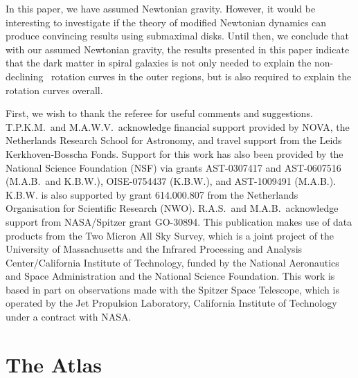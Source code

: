 \documentclass[traditabstract]{aa} %
\begin{document}
In this paper, we have assumed Newtonian gravity. However, it would be interesting to 
investigate if the theory of modified Newtonian dynamics \citep[MOND;][]{milgrom1983} can 
produce convincing results using submaximal disks. Until then, we conclude that with our 
assumed Newtonian gravity, the results presented in this paper indicate that the dark 
matter in spiral galaxies is not only needed to explain the non-declining \hone\ rotation 
curves in the outer regions, but is also required to explain the rotation curves overall.


\acknowledgements
First, we wish to thank the referee for useful comments and suggestions.
T.P.K.M.\ and M.A.W.V.\ acknowledge financial support provided by NOVA, the Netherlands
Research School for Astronomy, and travel support from the Leids Kerkhoven-Bosscha Fonds.
Support for this work has also been provided by the National Science Foundation (NSF) via
grants AST-0307417 and AST-0607516 (M.A.B.\ and K.B.W.), OISE-0754437 (K.B.W.), and
AST-1009491 (M.A.B.). K.B.W. is also supported by grant 614.000.807 from the Netherlands
Organisation for Scientific Research (NWO). R.A.S.\ and M.A.B.\ acknowledge support from
NASA/Spitzer grant GO-30894.
%
This publication makes use of data products from the Two Micron All Sky Survey, which is a
joint project of the University of Massachusetts and the Infrared Processing and Analysis
Center/California Institute of Technology, funded by the National Aeronautics and Space
Administration and the National Science Foundation.
This work is based in part on observations made with the Spitzer Space Telescope, which is
operated by the Jet Propulsion Laboratory, California Institute of Technology under a
contract with NASA.



\setlength{\bibsep}{1.3pt}


\appendix

\section{The Atlas}
\end{document}
